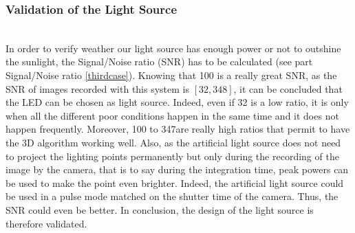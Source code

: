 \subsubsection{Validation of the Light Source}
\label{light Power}
~\\
In order to verify weather our light source has enough power or not to outshine the sunlight, the Signal/Noise ratio (SNR) has to be calculated (see part Signal/Noise ratio \ref{thirdcase}). Knowing that 100 is a really great SNR, as the SNR of images recorded with this system is $[32, 348]$, it can be concluded that the LED can be chosen as light source. Indeed, even if 32 is a low ratio, it is only when all the different poor conditions happen in the same time and it does not happen frequently. Moreover, 100 to 347are really high ratios that permit to have the 3D algorithm working well. Also, as the artificial light source does not need to project the lighting points permanently but only during the recording of the image by the camera, that is to say during the integration time, peak powers can be used to make the point even brighter. Indeed, the artificial light source could be used in a pulse mode matched on the shutter time of the camera. Thus, the SNR could even be better. In conclusion, the design of the light source is therefore validated.




